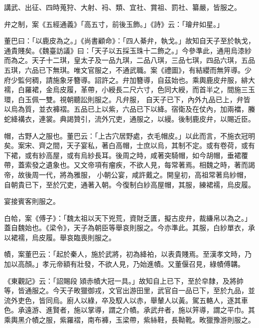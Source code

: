 \begin{pinyinscope}
 講武、出征、四時蒐狩、大射、祃、類、宜社、賞祖、罰社、纂嚴，皆服之。



 弁之制，案《五經通義》「高五寸，前後玉飾。」《詩》云：「璯弁如星。」



 董巴曰：「以鹿皮為之。」《尚書顧命》：「四人綦弁，執戈。」故知自天子至於執戈，通貴賤矣。《魏臺訪議》曰：「天子以五採玉珠十二飾之。」今參準此，通用烏漆紗而為之。天子十二琪，皇太子及一品九琪，二品八琪，三品七琪，四品六琪，五品五琪，六品已下無琪。唯文官服之，不通武職。案《禮圖》，有結纓而無笄導。少府少監何稠，請施象牙簪導。詔許之。弁加簪導，自茲始也。乘輿鹿皮弁服，緋大襦，白羅裙，金烏皮履，革帶，小綬長二尺六寸，色同大綬，而首半之，間施三玉環，白玉佩一雙。視朝聽訟則服之。凡弁服，
 自天子已下，內外九品已上，弁皆以烏為質，並衣褲褶。五品已上以紫，六品已下以絳。宿衛及在仗內，加兩襠，螣蛇絳褠衣，連裳。典謁贊引，流外冗吏，通服之，以縵。後制鹿皮弁，以賜近臣。



 帽，古野人之服也。董巴云：「上古穴居野處，衣毛帽皮。」以此而言，不施衣冠明矣。案宋、齊之間，天子宴私，著白高帽，士庶以烏，其制不定。或有卷荷，或有下裙，或有紗高屋，或有烏紗長耳。後周之時，咸著突騎帽，如今胡帽，垂裙覆帶，蓋索發之遺象也。又文帝項有瘤疾，不欲人見，每常著焉。相魏之時，著而謁帝，故後周一代，將為雅服，
 小朝公宴，咸許戴之。開皇初，高祖常著烏紗帽，自朝貴已下，至於冗吏，通著入朝。今復制白紗高屋帽，其服，練裙襦，烏皮履。



 宴接賓客則服之。



 白帢，案《傅子》：「魏太祖以天下兇荒，資財乏匱，擬古皮弁，裁縑帛以為之。」蓋自魏始也。《梁令》，天子為朝臣等舉哀則服之。今亦準此。其服，白紗單衣，承以裙襦，烏皮履。舉哀臨喪則服之。



 幘，案董巴云：「起於秦人，施於武將，初為絳袙，以表貴賤焉。至漢孝文時，乃加以高顏。」孝元帝額有壯發，不欲人見，乃始進幘。又董偃召見，綠幘傅韝。



 《東觀記》云：「詔賜段
 熲赤幘大冠一具。」故知自上已下，至於皁隸，及將帥等，皆通服之。今天子畋獵御戎，文官出游田里，武官自一品已下，至於九品，並流外吏色，皆同烏。廚人以綠，卒及馭人以赤，舉輦人以黃。駕五輅人，逐其車色。承遠游、進賢者，施以掌導，謂之介幘。承武弁者，施以笄導，謂之平巾。其乘輿黑介幘之服，紫羅褶，南布褲，玉梁帶，紫絲鞋，長靿靴。畋獵豫游則服之。




\end{pinyinscope}
